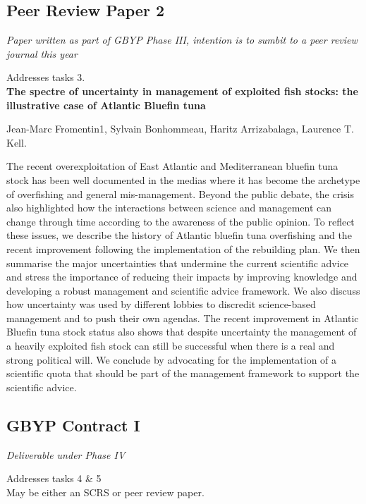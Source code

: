 \subsection{Peer Review Paper 2} 

\textit{Paper written as part of GBYP Phase III, intention is to sumbit to a peer review journal this year\\}

Addresses tasks  3.\\

\textbf{The spectre of uncertainty in management of exploited fish stocks: the illustrative case of Atlantic Bluefin tuna}

Jean-Marc Fromentin1, Sylvain Bonhommeau, Haritz Arrizabalaga, Laurence T. Kell. 


The recent overexploitation of East Atlantic and Mediterranean bluefin tuna stock has been well documented in the medias where it has become the archetype of overfishing and general mis-management. Beyond the public debate, the crisis also highlighted how the interactions between science and management can change through time according to the awareness of the public opinion. To reflect these issues, we describe the history of Atlantic bluefin tuna overfishing and the recent improvement following the implementation of the rebuilding plan. We then summarise the major uncertainties that undermine the current scientific advice and stress the importance of reducing their impacts by improving knowledge and developing a robust management and scientific advice framework. We also discuss how uncertainty was used by different lobbies to discredit science-based management and to push their own agendas. The recent improvement in Atlantic Bluefin tuna stock status also shows that despite uncertainty the management of a heavily exploited fish stock can still be successful when there is a real and strong political will. We conclude by advocating for the implementation of a scientific quota that should be part of the management framework to support the scientific advice.


\subsection{GBYP Contract I}

\textit{Deliverable under Phase IV\\}

Addresses tasks  4 \& 5\\

May be either an SCRS or peer review paper.


